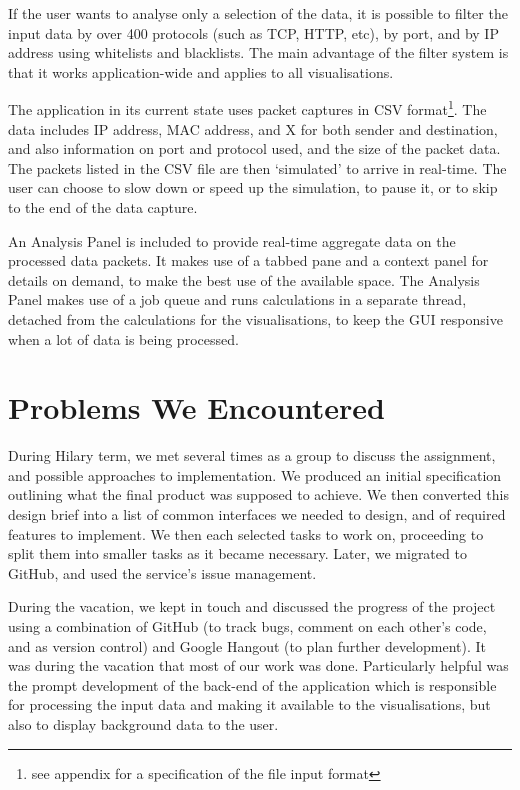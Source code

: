 \documentclass[12pt,a4paper]{article}
\begin{document}
			If the user wants to analyse only a selection of the data, it is possible to filter the input data by over 400 protocols (such as TCP, HTTP, etc), by port, and by IP address using whitelists and blacklists. The main advantage of the filter system is that it works application-wide and applies to all visualisations.
			
			The application in its current state uses packet captures in CSV format\footnote{see appendix for a specification of the file input format}. The data includes IP address, MAC address, and X for both sender and destination, and also information on port and protocol used, and the size of the packet data. The packets listed in the CSV file are then `simulated' to arrive in real-time. The user can choose to slow down or speed up the simulation, to pause it, or to skip to the end of the data capture.
			
			An Analysis Panel is included to provide real-time aggregate data on the processed data packets. It makes use of a tabbed pane and a context panel for details on demand, to make the best use of the available space. The Analysis Panel makes use of a job queue and runs calculations in a separate thread, detached from the calculations for the visualisations, to keep the GUI responsive when a lot of data is being processed.

	\section*{Problems We Encountered}
        During Hilary term, we met several times as a group to discuss the assignment, and possible approaches to implementation. We produced an initial specification outlining what the final product was supposed to achieve. We then converted this design brief into a list of common interfaces we needed to design, and of required features to implement. We then each selected tasks to work on, proceeding to split them into smaller tasks as it became necessary. Later, we migrated to GitHub, and used the service's issue management.
		
		During the vacation, we kept in touch and discussed the progress of the project using a combination of GitHub (to track bugs, comment on each other's code, and as version control) and Google Hangout (to plan further development). It was during the vacation that most of our work was done. Particularly helpful was the prompt development of the back-end of the application which is responsible for processing the input data and making it available to the visualisations, but also to display background data to the user.
		
\end{document}
